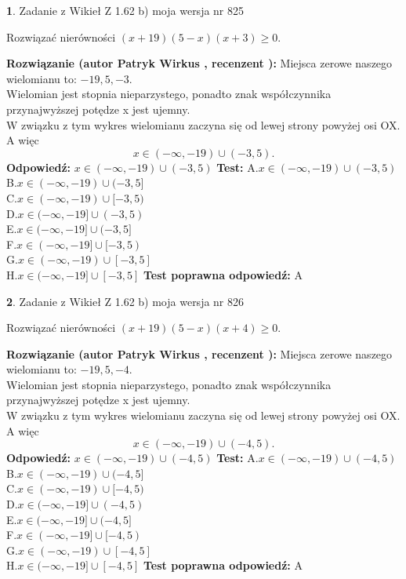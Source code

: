 \documentclass[12pt, a4paper]{article}
\theoremstyle{definition} %
\newtheorem{zad}{}
\newcommand{\zadStart}[1]{\begin{zad}#1\newline}
\newcommand{\zadStop}{\end{zad}}
\newcommand{\rozwStart}[2]{\noindent \textbf{Rozwiązanie (autor #1 , recenzent #2): }\newline}
\newcommand{\rozwStop}{\newline}
\newcommand{\odpStart}{\noindent \textbf{Odpowiedź:}\newline}
\newcommand{\odpStop}{\newline}
\newcommand{\testStart}{\noindent \textbf{Test:}\newline}
\newcommand{\testStop}{\newline}
\newcommand{\kluczStart}{\noindent \textbf{Test poprawna odpowiedź:}\newline}
\newcommand{\kluczStop}{\newline}
\begin{document}
\zadStart{Zadanie z Wikieł Z 1.62 b) moja wersja nr 825}

Rozwiązać nierówności $(x+19)(5-x)(x+3)\ge0$.
\zadStop
\rozwStart{Patryk Wirkus}{}
Miejsca zerowe naszego wielomianu to: $-19, 5, -3$.\\
Wielomian jest stopnia nieparzystego, ponadto znak współczynnika przy\linebreak najwyższej potędze x jest ujemny.\\ W związku z tym wykres wielomianu zaczyna się od lewej strony powyżej osi OX. A więc $$x \in (-\infty,-19) \cup (-3,5).$$
\rozwStop
\odpStart
$x \in (-\infty,-19) \cup (-3,5)$
\odpStop
\testStart
A.$x \in (-\infty,-19) \cup (-3,5)$\\
B.$x \in (-\infty,-19) \cup (-3,5]$\\
C.$x \in (-\infty,-19) \cup [-3,5)$\\
D.$x \in (-\infty,-19] \cup (-3,5)$\\
E.$x \in (-\infty,-19] \cup (-3,5]$\\
F.$x \in (-\infty,-19] \cup [-3,5)$\\
G.$x \in (-\infty,-19) \cup [-3,5]$\\
H.$x \in (-\infty,-19] \cup [-3,5]$
\testStop
\kluczStart
A
\kluczStop



\zadStart{Zadanie z Wikieł Z 1.62 b) moja wersja nr 826}

Rozwiązać nierówności $(x+19)(5-x)(x+4)\ge0$.
\zadStop
\rozwStart{Patryk Wirkus}{}
Miejsca zerowe naszego wielomianu to: $-19, 5, -4$.\\
Wielomian jest stopnia nieparzystego, ponadto znak współczynnika przy\linebreak najwyższej potędze x jest ujemny.\\ W związku z tym wykres wielomianu zaczyna się od lewej strony powyżej osi OX. A więc $$x \in (-\infty,-19) \cup (-4,5).$$
\rozwStop
\odpStart
$x \in (-\infty,-19) \cup (-4,5)$
\odpStop
\testStart
A.$x \in (-\infty,-19) \cup (-4,5)$\\
B.$x \in (-\infty,-19) \cup (-4,5]$\\
C.$x \in (-\infty,-19) \cup [-4,5)$\\
D.$x \in (-\infty,-19] \cup (-4,5)$\\
E.$x \in (-\infty,-19] \cup (-4,5]$\\
F.$x \in (-\infty,-19] \cup [-4,5)$\\
G.$x \in (-\infty,-19) \cup [-4,5]$\\
H.$x \in (-\infty,-19] \cup [-4,5]$
\testStop
\kluczStart
A
\kluczStop
\end{document}
